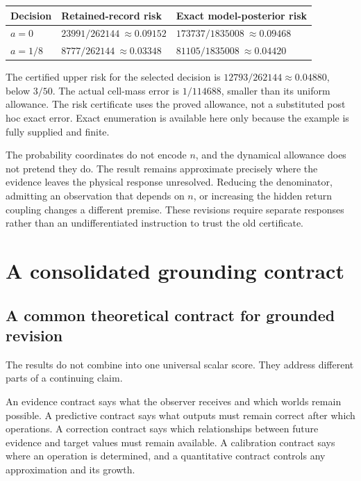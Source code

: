 \begin{center}\small
\begin{tabularx}{\textwidth}{@{}lXX@{}}\toprule
Decision & Retained-record risk & Exact model-posterior risk\\\midrule
$a=0$ & $23991/262144\ \approx0.09152$ & $173737/1835008\ \approx0.09468$\\
$a=1/8$ & $8777/262144\ \approx0.03348$ & $81105/1835008\ \approx0.04420$\\\bottomrule
\end{tabularx}
\end{center}
The certified upper risk for the selected decision is $12793/262144\approx0.04880$, below $3/50$. The actual cell-mass error is $1/114688$, smaller than its uniform allowance. The risk certificate uses the proved allowance, not a substituted post hoc exact error. Exact enumeration is available here only because the example is fully supplied and finite.

The probability coordinates do not encode $n$, and the dynamical allowance does not pretend they do. The result remains approximate precisely where the evidence leaves the physical response unresolved. Reducing the denominator, admitting an observation that depends on $n$, or increasing the hidden return coupling changes a different premise. These revisions require separate responses rather than an undifferentiated instruction to trust the old certificate.


\FloatBarrier
\chapter{A consolidated grounding contract}\label{GA:book:chapter-30}

\section{A common theoretical contract for grounded revision}\label{GA:sec:integration}
The results do not combine into one universal scalar score. They address different parts of a continuing claim.

An evidence contract says what the observer receives and which worlds remain possible. A predictive contract says what outputs must remain correct after which operations. A correction contract says which relationships between future evidence and target values must remain available. A calibration contract says where an operation is determined, and a quantitative contract controls any approximation and its growth.

